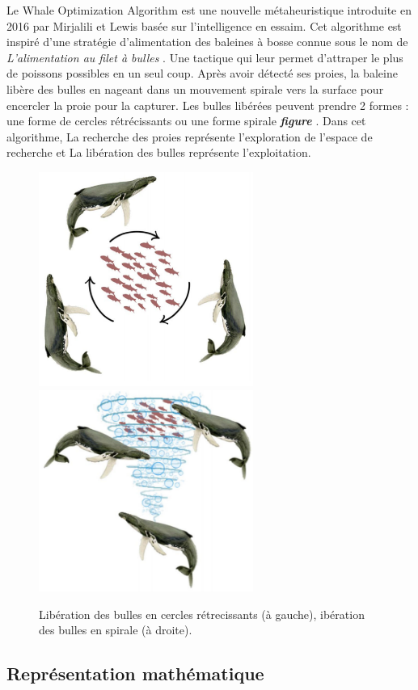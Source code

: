 \documentclass[12pt]{article}
\begin{document}
Le Whale Optimization Algorithm est une nouvelle métaheuristique introduite en 2016 par Mirjalili et Lewis basée sur l’intelligence en essaim. Cet algorithme est inspiré d’une stratégie d’alimentation des baleines à bosse connue sous le nom de \emph{L'alimentation au filet à bulles} . Une tactique qui leur permet d’attraper le plus de poissons possibles en un seul coup. Après avoir détecté ses proies, la baleine libère des bulles en nageant dans un mouvement spirale vers la surface pour encercler la proie pour la capturer.
Les bulles libérées peuvent prendre 2 formes : une forme de cercles rétrécissants ou une forme spirale \textbf{\emph{figure }}. 
Dans cet algorithme, La recherche des proies représente l’exploration de l’espace de recherche et La libération des bulles représente l’exploitation.
\begin{figure}[h!] 
    \includegraphics[width=7cm]{../figures/WOA/cercles.png}
    \includegraphics[width=7cm]{../figures/WOA/spiral.png}
    \caption{Libération des bulles en cercles rétrecissants (à gauche), ibération des bulles en spirale (à droite).}
    \label{fig:alimentation}
\end{figure}
\subsection{Représentation mathématique }
\end{document}
